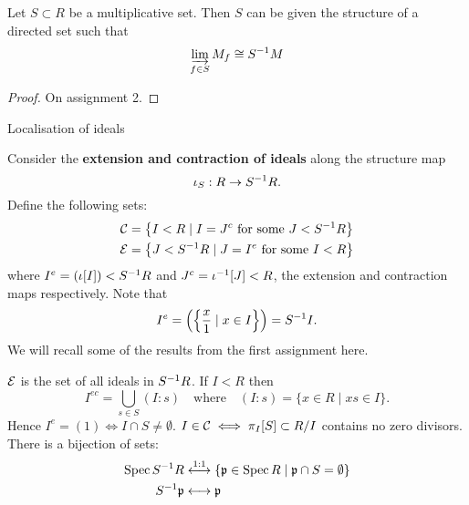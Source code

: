\begin{prop}[2.12]
  Let $S \subset R$ be a multiplicative set.
  Then $S$ can be given the structure of a directed set such that
  \[\varinjlim_{f \in S} M_f \cong S^{-1} M\]
\end{prop}

\begin{proof}
  On assignment 2.
\end{proof}

Localisation of ideals

\begin{defn}
  Consider the \textbf{extension and contraction of ideals} along the structure map
  \[\iota_S: R \to S^{-1} R.\]
  Define the following sets:
  \begin{align*}
    \mathcal{C} &= \left\{ I<R \mid I = J^c \text{ for some } J<S^{-1} R \right\} \\
    \mathcal{E} &= \left\{ J<S^{-1} R \mid J = I^e \text{ for some } I<R \right\}
  \end{align*}
  where $I^e = (\iota[I]) < S^{-1} R$ and $J^c = \iota^{-1}[J]<R$, the extension and contraction maps respectively.
  Note that
  \[I^e = \left( \left\{ \frac{x}{1} \mid x \in I \right\} \right) = S^{-1} I.\]
  We will recall some of the results from the first assignment here.
\end{defn}

\begin{prop}[2.13]
  \leavevmode
  \begin{enum}
    \io $\mathcal{E}$ is the set of all ideals in $S^{-1} R$.
    \io If $I<R$ then
    \[I^{ec} = \bigcup_{s \in S} (I:s) \quad\text{where}\quad (I:s) = \{ x \in R \mid xs \in I \}.\]
    Hence $I^e=(1) \iff I \cap S \neq \emptyset$.
    \io $I \in \mathcal{C} \iff \pi_I[S] \subset R/I$ contains no zero divisors.
    \io There is a bijection of sets:
    \begin{align*}
      \operatorname{Spec} S^{-1} R &\overset{1:1}{\longleftrightarrow} \left\{ \mathfrak{p} \in \operatorname{Spec} R \mid \mathfrak{p} \cap S = \emptyset \right\} \\
      S^{-1} \mathfrak{p} &\longleftrightarrow \mathfrak{p}
    \end{align*}
  \end{enum}
\end{prop}

